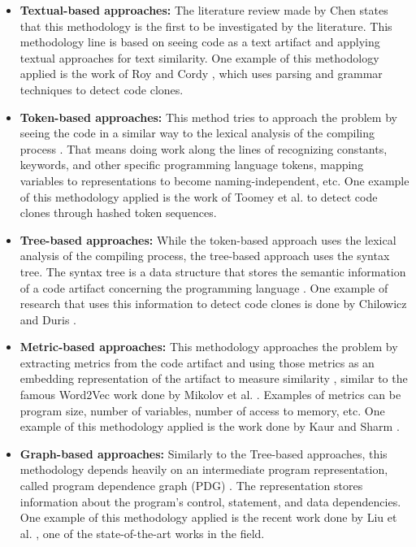 \begin{itemize}
	\item \textbf{Textual-based approaches:}  The literature review made by Chen \citep{litreview}  
	states that this methodology is the first to be investigated by the literature. This methodology line 
	is based on seeing code as a text artifact and applying textual approaches for text similarity. One 
	example of this methodology applied is the work of Roy and Cordy
	\citep{textexample},
	which uses parsing and grammar techniques to detect code clones.

	\item \textbf{Token-based approaches:} This method tries to approach the problem by seeing the code in a
	similar way to the lexical analysis of the compiling process \citep{litreview}. 
	That means doing work along the lines of recognizing constants, keywords, and other specific programming 
	language tokens, mapping variables to representations to become naming-independent, etc. One example 
	of this methodology applied is the work of Toomey et al. \citep{tokenexample} 
	to detect code clones through hashed token sequences.

	\item \textbf{Tree-based approaches:} While the token-based approach uses the lexical analysis of the 
	compiling process, the tree-based approach uses the syntax tree. The syntax tree is a data structure that 
	stores the semantic information of a code artifact concerning the programming language \citep{compiler}. 
	One example of research that uses this information to detect code clones is done by Chilowicz and Duris
	\citep{treeexample}.

	\item \textbf{Metric-based approaches:} This methodology approaches the problem by extracting metrics 
	from the code artifact and using those metrics as an embedding representation of the artifact to measure 
	similarity \citep{litreview}, similar to the famous Word2Vec work done by Mikolov et al.
	\citep{wordtovec}. Examples of metrics can be program size, number of variables, number of access to
	memory, etc. One example of this methodology applied is the work done by Kaur and Sharm
	\citep{metricexample}. 

	\item \textbf{Graph-based approaches:} Similarly to the Tree-based approaches, this methodology depends 
	heavily on an intermediate program representation, called program dependence graph (PDG) \citep{prodg}. 
	The representation stores information about the program’s control, statement, and data dependencies. 
	One example of this methodology applied is the recent work done by Liu et al. \citep{tailor},
	one of the state-of-the-art works in the field.

\end{itemize}

